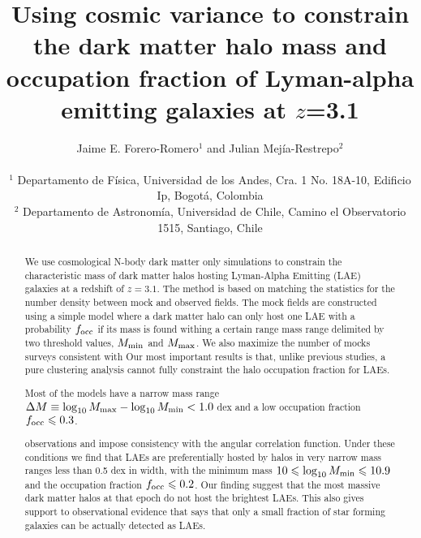 \documentclass[usenatbib]{mn2e}
\begin{document}
\title[Halo mass and occupation fraction for LAEs at $z=3.1$]{Using cosmic
  variance to constrain the dark matter halo mass and occupation
  fraction of Lyman-alpha emitting galaxies at $z$=3.1} 
  
\author[~J.~E. Forero-Romero and J. Mejia]{
\parbox[t]{\textwidth}{\raggedright 
Jaime E. Forero-Romero$^{1}$ and
Julian Mej\'ia-Restrepo$^{2}$ 
}
\vspace*{6pt}\\
$^{1}$ Departamento de F\'{i}sica, Universidad de los Andes, Cra. 1
No. 18A-10, Edificio Ip, Bogot\'a, Colombia \\
$^{2}$ Departamento de Astronom\'{i}a, Universidad de Chile, Camino el
Observatorio 1515, Santiago, Chile} 

\maketitle

\begin{abstract}
We use cosmological N-body dark matter only simulations to constrain the
characteristic mass of dark matter halos hosting Lyman-Alpha Emitting
(LAE) galaxies at a redshift of $z=3.1$. The method is based on
matching the statistics for the number density between mock and
observed fields. The mock fields are constructed using a simple model
where a dark matter halo can only host one LAE with a probability
$f_{\rm occ}$ if its mass is found withing a certain range mass range
delimited by two threshold values, $M_{\rm min}$ and $M_{\rm max}$. 
We also maximize the number of mocks surveys consistent with
Our most important results is that, unlike previous studies, a pure
clustering analysis cannot fully constraint the halo occupation
fraction for LAEs.

Most of the models have a narrow mass range $\Delta M \equiv
\log_{10}M_{\rm max} - \log_{10} M_{\rm min}< 1.0$ dex and a low
occupation fraction $f_{\rm occ}\leq 0.3$. 

observations and impose consistency with the angular correlation
function. Under these conditions we find that LAEs are preferentially
hosted by halos in very narrow mass ranges less than 0.5 dex in width,
with the minimum mass $10\leq \log_{10}M_{\rm min}\leq 10.9$ and the
occupation fraction $f_{\rm   occ}\leq 0.2$.  Our finding suggest that
the most massive dark matter halos at that epoch do not host the
brightest LAEs. This also gives support to observational evidence that
says that only a small fraction of star forming galaxies can be
actually detected as LAEs.
\end{abstract}
\end{document}

